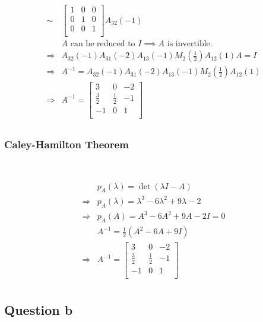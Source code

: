 \documentclass{article}
\begin{document}
\begin{equation*}
\begin{split}
        \sim&\begin{bmatrix}
            1&0&0\\
            0&1&0\\
            0&0&1\\
        \end{bmatrix}A_{32}(-1)\\
        &A\text{ can be reduced to }I\implies A\text{ is invertible}.\\
        \Rightarrow &A_{32}(-1)A_{31}(-2)A_{13}(-1)M_{2}(\frac{1}{2})A_{12}(1)A=I\\
        \Rightarrow &A^{-1}=A_{32}(-1)A_{31}(-2)A_{13}(-1)M_{2}(\frac{1}{2})A_{12}(1)\\
        \Rightarrow&A^{-1}=\begin{bmatrix}
            3&0&-2\\
            \frac{3}{2}&\frac{1}{2}&-1\\
            -1&0&1\\
        \end{bmatrix}\\
    \end{split}
\end{equation*}

\subsubsection{Caley-Hamilton Theorem}

~

\begin{equation*}
    \begin{split}
        &p_A(\lambda)=\det(\lambda I-A)\\
        \Rightarrow&p_A(\lambda)=\lambda^3-6\lambda^2+9\lambda-2\\
        \Rightarrow&p_A(A)=A^3-6A^2+9A-2I=0\\
        &A^{-1}=\frac{1}{2}(A^2-6A+9I)\\
        \Rightarrow& A^{-1}=\begin{bmatrix}
            3&0&-2\\
            \frac{3}{2}&\frac{1}{2}&-1\\
            -1&0&1\\
        \end{bmatrix}\\
    \end{split}
\end{equation*}

\subsection{Question b}
\end{document}
